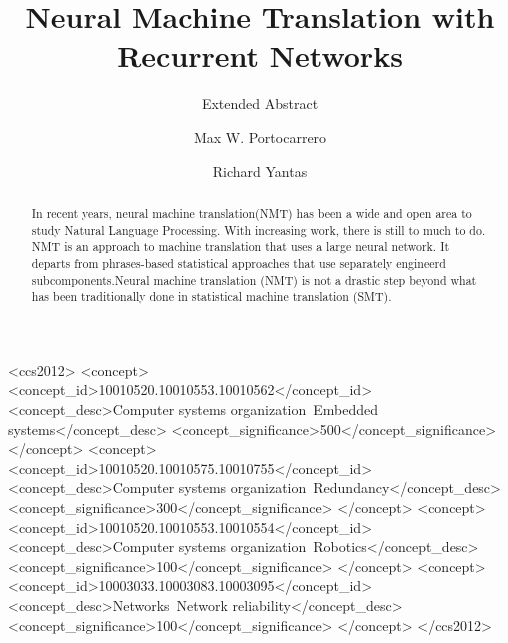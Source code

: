 \documentclass[sigconf]{acmart}
\begin{document}
\title{Neural Machine Translation with Recurrent Networks}
\subtitle{Extended Abstract}


\author{Max W. Portocarrero}

\author{Richard Yantas}


\renewcommand{\shortauthors}{M. Portocarrero \& R. Yantas}

\begin{abstract}
In recent years, neural machine translation(NMT) has been a wide and open area to study Natural
Language Processing. With increasing work, there is still to much to do.
NMT is an approach to machine translation that uses a large neural network. It departs from phrases-based statistical approaches that use separately engineerd subcomponents.Neural machine translation (NMT) is not a drastic step beyond what has been traditionally done in statistical machine translation (SMT).


\end{abstract}

%
%
\begin{CCSXML}
<ccs2012>
 <concept>
  <concept_id>10010520.10010553.10010562</concept_id>
  <concept_desc>Computer systems organization~Embedded systems</concept_desc>
  <concept_significance>500</concept_significance>
 </concept>
 <concept>
  <concept_id>10010520.10010575.10010755</concept_id>
  <concept_desc>Computer systems organization~Redundancy</concept_desc>
  <concept_significance>300</concept_significance>
 </concept>
 <concept>
  <concept_id>10010520.10010553.10010554</concept_id>
  <concept_desc>Computer systems organization~Robotics</concept_desc>
  <concept_significance>100</concept_significance>
 </concept>
 <concept>
  <concept_id>10003033.10003083.10003095</concept_id>
  <concept_desc>Networks~Network reliability</concept_desc>
  <concept_significance>100</concept_significance>
 </concept>
</ccs2012>  
\end{CCSXML}
\end{document}
